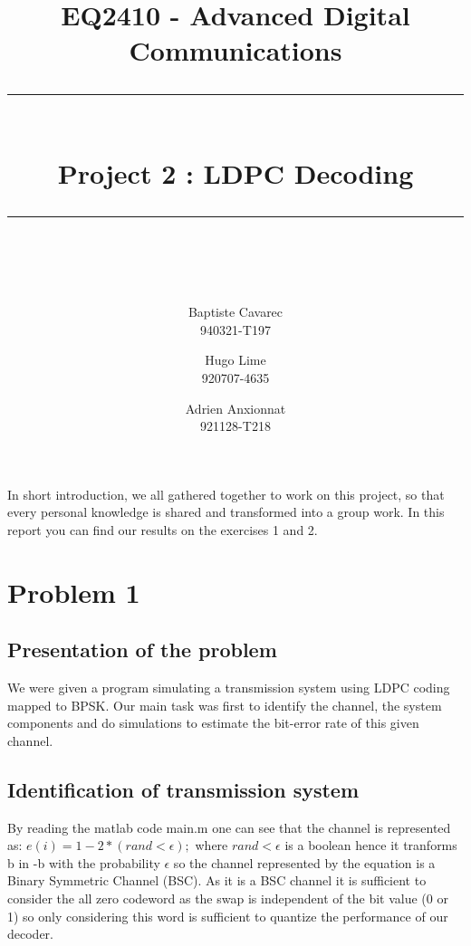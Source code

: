 \documentclass[a4paper]{article}
\begin{document}
\newcommand{\HRule}{\rule{\linewidth}{0.5mm}} 
\title{{\LARGE EQ2410 - Advanced Digital Communications} \\[0.5cm] \HRule \\[0.4cm]{Project 2 : LDPC Decoding}\\[0.2cm] \HRule \\[0.5cm] }
\author{Baptiste Cavarec \\ 940321-T197 \and Hugo Lime\\  920707-4635 \and Adrien Anxionnat\\ 921128-T218}

\maketitle
\abstract
In short introduction, we all gathered together to work on this project, so that every personal knowledge is shared and transformed into a group work. In this report you can find our results on the exercises 1 and 2.
\section{Problem 1}
\subsection{Presentation of the problem}
We were given a program simulating a transmission system using LDPC coding mapped to BPSK. Our main task was first to identify the channel, the system components and do simulations to estimate the bit-error rate of this given channel.
\subsection{Identification of transmission system}

By reading the matlab code main.m one can see that the channel is represented as: $e(i)= 1-2*(rand<\epsilon);$ where $rand<\epsilon$ is a boolean hence it tranforms b in -b with the probability $\epsilon$ so the channel represented by the equation is a Binary Symmetric Channel (BSC).
As it is a BSC channel it is sufficient to consider the all zero codeword as the swap is independent of the bit value (0 or 1) so only considering this word is sufficient to quantize the performance of our decoder.\\
\end{document}
